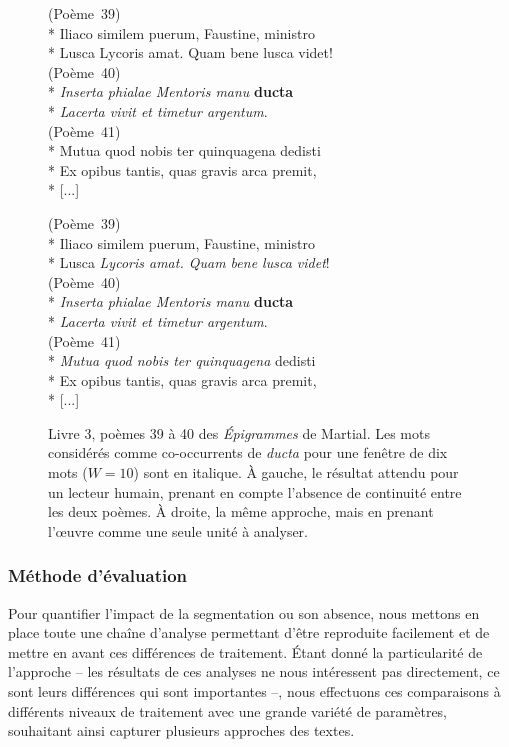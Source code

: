\begin{figure}
\small
\begin{minipage}[t]{0.45\textwidth}
(Poème~39)\\*
Iliaco similem puerum, Faustine, ministro\\*
Lusca Lycoris amat. Quam bene lusca videt!\\
(Poème~40)\\*
\textit{Inserta phialae Mentoris manu} \textbf{ducta}\\*
\textit{Lacerta vivit et timetur argentum}.\\
(Poème~41)\\*
Mutua quod nobis ter quinquagena dedisti\\*
Ex opibus tantis, quas gravis arca premit,\\* {[...]}
\end{minipage} \hfill
\begin{minipage}[t]{0.45\textwidth}
(Poème~39)\\*
Iliaco similem puerum, Faustine, ministro\\*
Lusca \textit{Lycoris amat. Quam bene lusca videt}!\\
(Poème~40)\\*
\textit{Inserta phialae Mentoris manu} \textbf{ducta}\\*
\textit{Lacerta vivit et timetur argentum}.\\
(Poème~41)\\*
\textit{Mutua quod nobis ter quinquagena} dedisti\\*
Ex opibus tantis, quas gravis arca premit,\\*  {[...]}
\end{minipage}
\caption{Livre 3, poèmes 39 à 40 des \textit{Épigrammes} de Martial. Les mots considérés comme co-occurrents de \textit{ducta} pour une fenêtre de dix mots ($W=10$) sont en italique. À gauche, le résultat attendu pour un lecteur humain, prenant en compte l'absence de continuité entre les deux poèmes. À droite, la même approche, mais en prenant l'œuvre comme une seule unité à analyser.}
\label{exc:epigrams}
\end{figure}


\subsubsection{Méthode d'évaluation}

Pour quantifier l'impact de la segmentation ou son absence, nous mettons en place toute une chaîne d'analyse permettant d'être reproduite facilement et de mettre en avant ces différences de traitement. Étant donné la particularité de l'approche -- les résultats de ces analyses ne nous intéressent pas directement, ce sont leurs différences qui sont importantes --, nous effectuons ces comparaisons à différents niveaux de traitement avec une grande variété de paramètres, souhaitant ainsi capturer plusieurs approches des textes.


